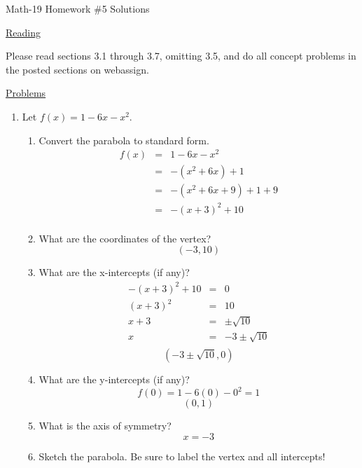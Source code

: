 \documentclass[letterpaper,12pt,fleqn]{article}
\begin{document}
\begin{center}
\Large Math-19 Homework \#5 Solutions
\end{center}

\vspace{0.5in}

\underline{Reading}

Please read sections 3.1 through 3.7, omitting 3.5, and do all concept problems
in the posted sections on web\-assign.

\underline{Problems}

\begin{enumerate}
\item Let $f(x)=1-6x-x^2$.
\begin{enumerate}
\item Convert the parabola to standard form.
\begin{eqnarray*}
f(x) &=& 1-6x-x^2 \\
    &=& -(x^2+6x)+1 \\
    &=& -(x^2+6x+9)+1+9 \\
    &=& -(x+3)^2+10 \\
\end{eqnarray*}

\item What are the coordinates of the vertex?
\[(-3,10)\]

\item What are the x-intercepts (if any)?
\begin{eqnarray*}
-(x+3)^2+10 &=& 0 \\
(x+3)^2 &=& 10 \\
x+3 &=& \pm\sqrt{10} \\
x &=& -3\pm\sqrt{10} \\
\end{eqnarray*}
\[(-3\pm\sqrt{10},0)\]

\item What are the y-intercepts (if any)?
\[f(0)=1-6(0)-0^2=1\]
\[(0,1)\]

\item What is the axis of symmetry?
\[x=-3\]
\newpage
\item Sketch the parabola. Be sure to label the vertex and all intercepts!



\end{enumerate}
\end{enumerate}
\end{document}
